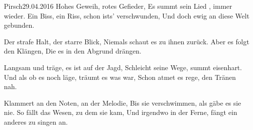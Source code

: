 \begin{poem}[][ornalion]{Pirsch}{29.04.2016}
Hohes Geweih, rotes Gefieder,
Es summt sein Lied , immer wieder.
Ein Biss, ein Riss, schon ists' verschwunden,
Und doch ewig an diese Welt gebunden.

Der strafe Halt, der starre Blick,
Niemals schaut es zu ihnen zurück.
Aber es folgt den Klängen,
Die es in den Abgrund drängen.

Langsam und träge, es ist auf der Jagd,
Schleicht seine Wege, summt eisenhart.
Und als ob es noch läge, träumt es was war,
Schon atmet es rege, den Tränen nah.

Klammert an den Noten, an der Melodie,
Bis sie verschwimmen, als gäbe es sie nie.
So fällt das Wesen, zu dem sie kam,
Und irgendwo in der Ferne, fängt ein anderes
zu singen an.
\end{poem}